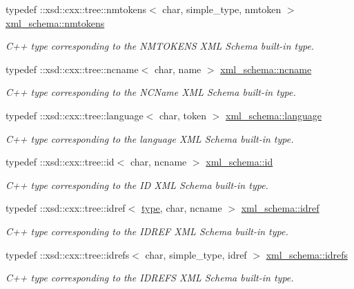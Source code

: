 \begin{DoxyCompactItemize}
typedef \+::xsd\+::cxx\+::tree\+::nmtokens$<$ char, simple\+\_\+type, nmtoken $>$ \hyperlink{namespacexml__schema_af680cdfd739686fb9b689667435092f8}{xml\+\_\+schema\+::nmtokens}
\begin{DoxyCompactList}\small\item\em C++ type corresponding to the N\+M\+T\+O\+K\+E\+N\+S X\+M\+L Schema built-\/in type. \end{DoxyCompactList}\item 
typedef \+::xsd\+::cxx\+::tree\+::ncname$<$ char, name $>$ \hyperlink{namespacexml__schema_a926a5ddb21b27435d0206310d8fc67b7}{xml\+\_\+schema\+::ncname}
\begin{DoxyCompactList}\small\item\em C++ type corresponding to the N\+C\+Name X\+M\+L Schema built-\/in type. \end{DoxyCompactList}\item 
typedef \+::xsd\+::cxx\+::tree\+::language$<$ char, token $>$ \hyperlink{namespacexml__schema_ae05c7556bd944abd5b9b1ab87dd9c325}{xml\+\_\+schema\+::language}
\begin{DoxyCompactList}\small\item\em C++ type corresponding to the language X\+M\+L Schema built-\/in type. \end{DoxyCompactList}\item 
typedef \+::xsd\+::cxx\+::tree\+::id$<$ char, ncname $>$ \hyperlink{namespacexml__schema_a398fa1a00d828dc3bd1aadf89e68a3fb}{xml\+\_\+schema\+::id}
\begin{DoxyCompactList}\small\item\em C++ type corresponding to the I\+D X\+M\+L Schema built-\/in type. \end{DoxyCompactList}\item 
typedef \+::xsd\+::cxx\+::tree\+::idref$<$ \hyperlink{classtype}{type}, char, ncname $>$ \hyperlink{namespacexml__schema_ac4af625f2450257be84f5475dbfe8fdd}{xml\+\_\+schema\+::idref}
\begin{DoxyCompactList}\small\item\em C++ type corresponding to the I\+D\+R\+E\+F X\+M\+L Schema built-\/in type. \end{DoxyCompactList}\item 
typedef \+::xsd\+::cxx\+::tree\+::idrefs$<$ char, simple\+\_\+type, idref $>$ \hyperlink{namespacexml__schema_adb5f7e4c5a09caf31f94ace50b148674}{xml\+\_\+schema\+::idrefs}
\begin{DoxyCompactList}\small\item\em C++ type corresponding to the I\+D\+R\+E\+F\+S X\+M\+L Schema built-\/in type. \end{DoxyCompactList}\item 

\end{DoxyCompactItemize}
